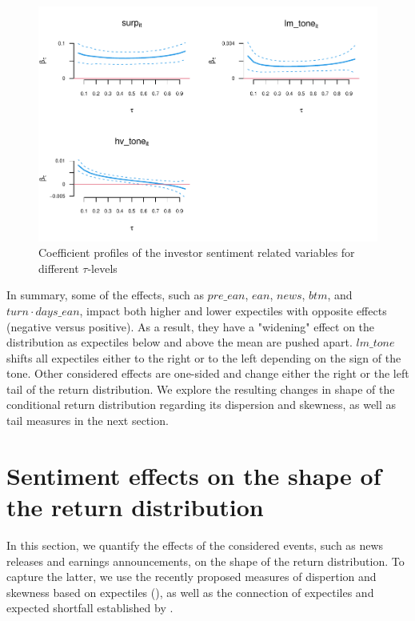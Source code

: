 \documentclass[11pt]{article}
\begin{document}
\begin{figure}[h!]
\centering
\includegraphics{sentiment_analysis_files/figure-latex/figure3-1.pdf}
\caption{\label{fig:figure3}Coefficient profiles of the investor sentiment related variables for different \(\tau\)-levels}
\end{figure}

In summary, some of the effects, such as $pre\_ean$, $ean$, $news$, $btm$, and $turn\cdot days\_ean$, impact both higher and lower expectiles with opposite effects (negative versus positive). As a result, they have a "widening" effect on the distribution as expectiles below and above the mean are pushed apart. $lm\_tone$ shifts all expectiles either to the right or to the left depending on the sign of the tone. Other considered effects are one-sided and change either the right or the left tail of the return distribution. We explore the resulting changes in shape of the conditional return distribution regarding its dispersion and skewness, as well as tail measures in the next section.


\hypertarget{quantifying-the-effects-on-the-shape-of-the-return-distribution}{%
\section{Sentiment effects on the shape of the return distribution}\label{quantifying-the-effects-on-the-shape-of-the-return-distribution}}

In this section, we quantify the effects of the considered events, such as news releases and earnings announcements, on the shape of the return distribution. To capture the latter, we use the recently proposed measures of dispertion and skewness based on expectiles (\cite{eberl2022}), as well as the connection of expectiles and expected shortfall established by \cite{Taylor2008}.
\end{document}
